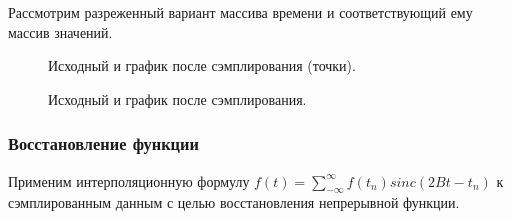 \documentclass[a5paper, 10pt]{article}
\theoremstyle{definition}
\theoremstyle{plain}
\theoremstyle{remark}
\begin{document}
Рассмотрим разреженный вариант массива времени и соответствующий ему массив значений.
\begin{figure}[h!]
\caption{Исходный и график после сэмплирования (точки).}
\caption{Исходный и график после сэмплирования.}
\end{figure}

\subsubsection{Восстановление функции}
Применим интерполяционную формулу $f(t) = \sum \limits_{-\infty}^{\infty} f \left( t_n \right) sinc \left(2Bt - t_n \right)$ к сэмплированным данным с целью восстановления непрерывной функции.
\end{document}
